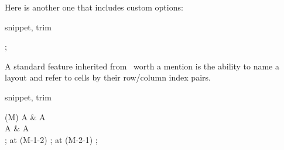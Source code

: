 Here is another one that includes custom options:

\begin{tcblisting}{snippet, trim}
\begin{codi}[square=3em]
;
\end{codi}
\end{tcblisting}

A standard feature inherited from \TikZ\ worth a mention
is the ability to name a layout and refer to cells
by their row/column index pairs.

\begin{tcblisting}{snippet, trim}
\begin{codi}[square=3em]
\obj (M) { A & A \\ A & A \\ };
\node [draw=red,  shape=circle, minimum size=2em] at (M-1-2) {};
\node [draw=blue, shape=circle, minimum size=2em] at (M-2-1) {};
\end{codi}
\end{tcblisting}

